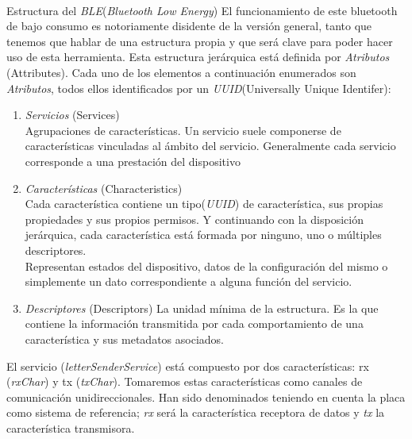 \begin{teoria}{Estructura del \textit{BLE}(\textit{Bluetooth Low Energy})\textsuperscript{\cite{BLEAndroid, BLEguide, BLEOreilly}}}
    \color{mitexto}
    El funcionamiento de este bluetooth de bajo consumo es notoriamente
    disidente de la versión general, tanto que tenemos que hablar de una
    estructura propia y que será clave para poder hacer uso de esta
    herramienta.
    Esta estructura jerárquica está definida por \textit{\textit{Atributos}}
    {\footnotesize(Attributes)}.
    Cada uno de los elementos a continuación enumerados son
    \textit{\textit{Atributos}}, todos ellos identificados por un
    \textit{\textit{UUID}}{\footnotesize(Universally Unique Identifer)}:
    \begin{enumerate}
        \itemsep0em 
        \item \textit{\textit{Servicios}} {\footnotesize(Services)}\\
        {\small Agrupaciones de características. Un servicio suele
        componerse de características vinculadas al ámbito del servicio.
        Generalmente cada servicio corresponde a una prestación del
        dispositivo}
        \item \textit{\textit{Características}} {\footnotesize(Characteristics)}\\
        {\small Cada característica contiene un tipo(\textit{\textit{UUID}})
        de característica, sus propias propiedades y sus
        propios permisos. Y continuando con
        la disposición jerárquica, cada característica está formada
        por ninguno, uno o múltiples descriptores.\\
        Representan estados del dispositivo, datos de la configuración
        del mismo o simplemente un dato correspondiente a alguna
        función del servicio.}
        \item \textit{\textit{Descriptores}} {\footnotesize(Descriptors)}
        {\small La unidad mínima de la estructura. Es la que contiene
        la información transmitida por cada comportamiento de una
        característica y sus metadatos asociados.}
    \end{enumerate}
\end{teoria}

El servicio (\textit{letterSenderService}) está compuesto por dos características:
rx (\textit{rxChar}) y tx (\textit{txChar}). Tomaremos estas características
como canales de comunicación unidireccionales. Han sido denominados teniendo
en cuenta la placa como
sistema de referencia; \textit{rx} será la característica receptora de datos y 
\textit{tx} la característica transmisora.

